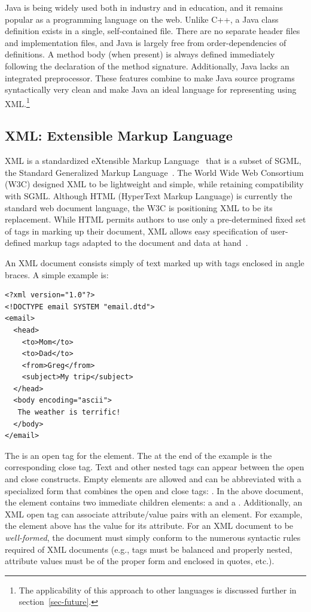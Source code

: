 \documentclass{article}
\begin{document}
\begin{multicols}{2}
Java is being widely used both in industry and in education, and it
remains popular as a programming language on the web.  Unlike C++, a
Java class definition exists in a single, self-contained file.  There
are no separate header files and implementation files, and Java is
largely free from order-dependencies of definitions.  A method body
(when present) is always defined immediately following the declaration
of the method signature.  Additionally, Java lacks an integrated
preprocessor.  These features combine to make Java source programs
syntactically very clean and make Java an ideal language for
representing using XML.\footnote{The applicability of this approach to
  other languages is discussed further in section~\ref{sec-future}.}

\subsection{XML: Extensible Markup Language}

XML is a standardized eXtensible Markup Language~\cite{XML} that is a
subset of SGML, the Standard Generalized Markup Language~\cite{SGML}.
The World Wide Web Consortium (W3C) designed XML to be lightweight and
simple, while retaining compatibility with SGML.  Although HTML
(HyperText Markup Language) is currently the standard web document
language, the W3C is positioning XML to be its replacement.  While HTML
permits authors to use only a pre-determined fixed set of tags in
marking up their document, XML allows easy specification of user-defined
markup tags adapted to the document and data at
hand~\cite{Goosens99,Goldfarb98}.

An XML document consists simply of text marked up with tags enclosed in
angle braces.  A simple example is:

\begin{verbatim}
<?xml version="1.0"?>
<!DOCTYPE email SYSTEM "email.dtd">
<email>
  <head>
    <to>Mom</to>
    <to>Dad</to>
    <from>Greg</from>
    <subject>My trip</subject>
  </head>
  <body encoding="ascii">
   The weather is terrific!
  </body>
</email>
\end{verbatim}

The  is an open tag for the  element.
The  at the end of the example is the corresponding
close tag.  Text and other nested tags can appear between the open and
close constructs. Empty elements are allowed and can be abbreviated with
a specialized form that combines the open and close tags:
.  In the above document, the
 element contains two immediate children elements: a
 and a .  Additionally, an XML open tag
can associate attribute/value pairs with an element.  For example, the
 element above has the value  for its
 attribute.  For an XML document to be
\emph{well-formed}, the document must simply conform to the numerous
syntactic rules required of XML documents (e.g., tags must be balanced
and properly nested, attribute values must be of the proper form and
enclosed in quotes, etc.).


\end{multicols}
\end{document}
